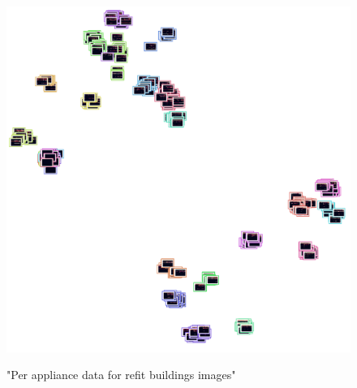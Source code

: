 \begin{figure}[H]
	\centering
	\caption{"Per appliance data for refit buildings images"}
	\includegraphics[width=.9\textwidth]{Figures/TSNE/TSNE_BOA/refit/img_scatter_refitall.png}
	\label{fig:tsne_boa_img_scatter_refit8}
\end{figure}
